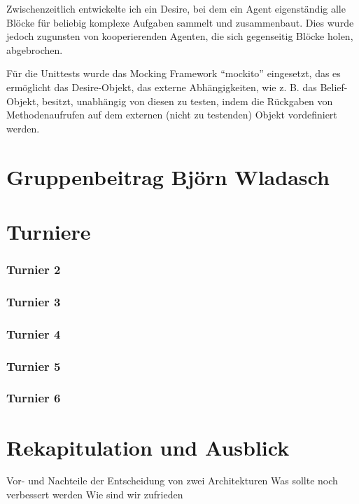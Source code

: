 \documentclass[runningheads]{llncs}
\begin{document}
Zwischenzeitlich entwickelte ich ein Desire, bei dem ein Agent eigenständig alle Blöcke für beliebig komplexe Aufgaben sammelt und zusammenbaut. Dies wurde jedoch zugunsten von kooperierenden Agenten, die sich gegenseitig Blöcke holen, abgebrochen.

Für die Unittests wurde das Mocking Framework "`mockito"' eingesetzt, das es ermöglicht das Desire-Objekt, das externe Abhängigkeiten, wie z. B. das Belief-Objekt, besitzt, unabhängig von diesen zu testen, indem die Rückgaben von Methodenaufrufen auf dem externen (nicht zu testenden) Objekt vordefiniert werden. 



\section{Gruppenbeitrag Björn Wladasch}

\section{Turniere}
\subsubsection{Turnier 2}
\subsubsection{Turnier 3}
\subsubsection{Turnier 4}
\subsubsection{Turnier 5}
\subsubsection{Turnier 6}

\section{Rekapitulation und Ausblick}
Vor- und Nachteile der Entscheidung von zwei Architekturen
Was sollte noch verbessert werden
Wie sind wir zufrieden
\end{document}
